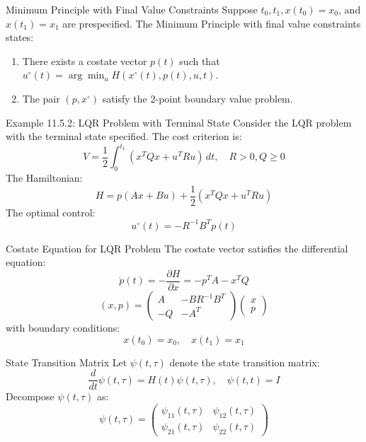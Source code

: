 \documentclass[10pt]{beamer}
\begin{document}
\begin{frame}[fragile]{Minimum Principle with Final Value Constraints}
  Suppose \( t_0, t_1, x(t_0) = x_0 \), and \( x(t_1) = x_1 \) are prespecified. The Minimum Principle with final value constraints states:
  \begin{enumerate}
      \item There exists a costate vector \( p(t) \) such that \( u^\circ(t) = \arg \min_u H(x^\circ(t), p(t), u, t) \).
      \item The pair \( (p, x^\circ) \) satisfy the 2-point boundary value problem.
  \end{enumerate}
\end{frame}
  
\begin{frame}[fragile]{Example 11.5.2: LQR Problem with Terminal State}
  Consider the LQR problem with the terminal state specified. The cost criterion is:
  \[
  V = \frac{1}{2} \int_0^{t_1} (x^T Q x + u^T R u) \, dt, \quad R > 0, Q \ge 0
  \]
  The Hamiltonian:
  \[
  H = p (A x + B u) + \frac{1}{2} (x^T Q x + u^T R u)
  \]
  The optimal control:
  \[
  u^\circ(t) = -R^{-1} B^T p(t)
  \]
\end{frame}
  
\begin{frame}[fragile]{Costate Equation for LQR Problem}
  The costate vector satisfies the differential equation:
  \[
  \dot{p}(t) = -\frac{\partial H}{\partial x} = -p^T A - x^T Q
  \]
  \[
  (x, p) = \begin{pmatrix}
  A & -BR^{-1}B^T \\
  -Q & -A^T
  \end{pmatrix} \begin{pmatrix}
  x \\
  p
  \end{pmatrix}
  \]
  with boundary conditions:
  \[
  x(t_0) = x_0, \quad x(t_1) = x_1
  \]
\end{frame}
  
\begin{frame}[fragile]{State Transition Matrix}
  Let \( \psi(t, \tau) \) denote the state transition matrix:
  \[
  \frac{d}{dt} \psi(t, \tau) = H(t) \psi(t, \tau), \quad \psi(t, t) = I
  \]
  Decompose \( \psi(t, \tau) \) as:
  \[
  \psi(t, \tau) = \begin{pmatrix}
  \psi_{11}(t, \tau) & \psi_{12}(t, \tau) \\
  \psi_{21}(t, \tau) & \psi_{22}(t, \tau)
  \end{pmatrix}
  \]
\end{frame}
  
\end{document}
